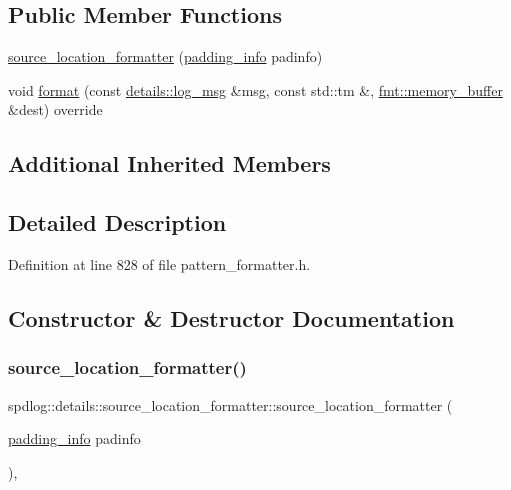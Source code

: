 \subsection*{Public Member Functions}
\begin{DoxyCompactItemize}
\item 
\hyperlink{classspdlog_1_1details_1_1source__location__formatter_a045946c595dd299307511d89b404fe31}{source\+\_\+location\+\_\+formatter} (\hyperlink{structspdlog_1_1details_1_1padding__info}{padding\+\_\+info} padinfo)
\item 
void \hyperlink{classspdlog_1_1details_1_1source__location__formatter_af0d34490d35c582fdb1553a27f03e147}{format} (const \hyperlink{structspdlog_1_1details_1_1log__msg}{details\+::log\+\_\+msg} \&msg, const std\+::tm \&, \hyperlink{format_8h_a21cbf729f69302f578e6db21c5e9e0d2}{fmt\+::memory\+\_\+buffer} \&dest) override
\end{DoxyCompactItemize}
\subsection*{Additional Inherited Members}


\subsection{Detailed Description}


Definition at line 828 of file pattern\+\_\+formatter.\+h.



\subsection{Constructor \& Destructor Documentation}
\mbox{\label{classspdlog_1_1details_1_1source__location__formatter_a045946c595dd299307511d89b404fe31}} 
\subsubsection{\texorpdfstring{source\+\_\+location\+\_\+formatter()}{source\_location\_formatter()}}
{\footnotesize\ttfamily spdlog\+::details\+::source\+\_\+location\+\_\+formatter\+::source\+\_\+location\+\_\+formatter (\begin{DoxyParamCaption}\item[{\hyperlink{structspdlog_1_1details_1_1padding__info}{padding\+\_\+info}}]{padinfo }\end{DoxyParamCaption})\hspace{0.3cm}{\ttfamily [inline]}, {\ttfamily [explicit]}}



